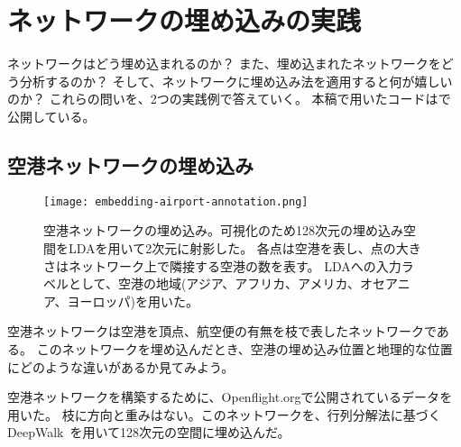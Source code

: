 \documentclass[12pt]{jarticle}
\begin{document}


\section{ネットワークの埋め込みの実践}

ネットワークはどう埋め込まれるのか？
また、埋め込まれたネットワークをどう分析するのか？
そして、ネットワークに埋め込み法を適用すると何が嬉しいのか？
これらの問いを、2つの実践例で答えていく。
本稿で用いたコードは\cite{code}で公開している。

\subsection{空港ネットワークの埋め込み}

\begin{figure}
    \centering
    \texttt{[image: embedding-airport-annotation.png]}
    \caption{
        空港ネットワークの埋め込み。可視化のため128次元の埋め込み空間をLDAを用いて2次元に射影した。
        各点は空港を表し、点の大きさはネットワーク上で隣接する空港の数を表す。
        LDAへの入力ラベルとして、空港の地域(アジア、アフリカ、アメリカ、オセアニア、ヨーロッパ)を用いた。
    }
    \label{fig:airport}
\end{figure}

空港ネットワークは空港を頂点、航空便の有無を枝で表したネットワークである。
このネットワークを埋め込んだとき、空港の埋め込み位置と地理的な位置にどのような違いがあるか見てみよう。

空港ネットワークを構築するために、Openflight.orgで公開されているデータ\cite{opsahl_2011}を用いた。
枝に方向と重みはない。このネットワークを、行列分解法に基づくDeepWalk~\cite{Qiu2018}を用いて128次元の空間に埋め込んだ。
\end{document}

